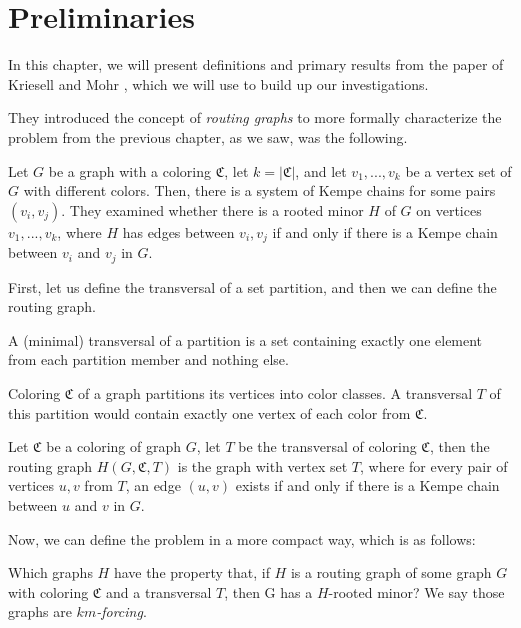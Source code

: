 \chapter{Preliminaries}

In this chapter, we will present definitions and primary results from the paper of 
Kriesell and Mohr \cite{matthias_2022}, which we will use to build up our investigations.

They introduced the concept of \textit{routing graphs} to more formally characterize the problem from the previous chapter, as we saw, was
the following.

Let $G$ be a graph with a coloring
$\mathfrak{C}$, let $k = |\mathfrak{C}|$, and let $v_1, ..., v_{k}$ be a vertex set of $G$ with different colors.
Then, there is a system of Kempe chains for some pairs $(v_i, v_j)$.
They examined whether there is a rooted minor $H$ of $G$ on vertices $v_1, ..., v_{k}$, where $H$ has edges between 
$v_i, v_j$ if and only if there is a Kempe chain between $v_i$ and $v_j$ in $G$.

First, let us define the transversal of a set partition, and then we can define the routing graph.

\begin{defn}
 A (minimal) transversal of a partition is a set containing exactly one
 element from each partition member and nothing else.
\end{defn}

\begin{example}
 Coloring $\mathfrak{C}$ of a graph partitions its vertices into color classes. 
 A transversal $T$ of this partition would contain exactly one vertex of each color from $\mathfrak{C}$.
\end{example}

\begin{defn}
Let $\mathfrak{C}$ be a coloring of graph $G$, let $T$ be the transversal of coloring $\mathfrak{C}$, 
then the routing graph $H(G, \mathfrak{C}, T)$ is the graph with vertex set $T$,
where for every pair of vertices $u,v$ from $T$, an edge $(u,v)$ exists if and only if
there is a Kempe chain between $u$ and $v$ in $G$.
\end{defn}

Now, we can define the problem in a more compact way, which is as follows:

Which graphs $H$ have the property that, if $H$ is a
routing graph of some graph $G$ with coloring $\mathfrak{C}$ and a transversal $T$, then G
has a $H$-rooted minor? We say those graphs are \textit{$km$-forcing}.

